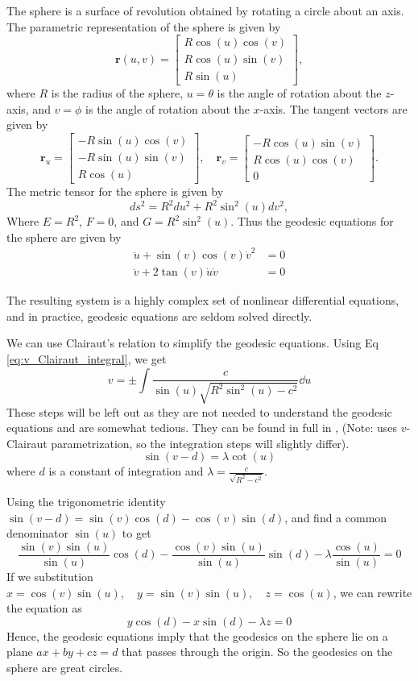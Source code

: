 \documentclass[12pt]{article}
\begin{document}
The sphere is a surface of revolution obtained by rotating a circle about an axis.
The parametric representation of the sphere is given by
\[
    \mathbf{r}(u, v) = \begin{bmatrix} R \cos (u) \cos (v) \\ R \cos (u) \sin (v) \\ R \sin (u) \end{bmatrix},
\]
where \(R\) is the radius of the sphere, \(u = \theta\) is the angle of rotation about the \(z\)-axis, and \(v = \phi\) is the angle of rotation about the \(x\)-axis.
The tangent vectors are given by
\[
    \mathbf{r}_u = \begin{bmatrix} -R \sin (u) \cos (v) \\ -R \sin (u) \sin (v) \\ R \cos (u) \end{bmatrix}, \quad \mathbf{r}_v = \begin{bmatrix} -R \cos (u) \sin (v) \\ R \cos (u) \cos (v) \\ 0 \end{bmatrix}.
\]
The metric tensor for the sphere is given by
\[
    ds^2 = R^2 du^2 + R^2 \sin^2 (u) dv^2,
\]
Where \(E = R^2 \), \(F = 0\), and \(G = R^2 \sin^2 (u)\).
Thus the geodesic equations for the sphere are given by
\begin{align*}
    \ddot{u} + \sin(v) \cos(v) \dot{v}^2 &= 0 \\
    \ddot{v} + 2\tan(v) \dot{u} \dot{v} &= 0 
\end{align*}

The resulting system is a highly complex set of nonlinear differential equations, and in practice, geodesic equations are seldom solved directly.

We can use Clairaut's relation to simplify the geodesic equations.
Using Eq \eqref{eq:v_Clairaut_integral}, we get 
\[
    v = \pm \int \frac{c}{\sin(u)\sqrt{R^2\sin^{2}(u) - c^{2}}} \dd{u}
\]
These steps will be left out as they are not needed to understand the geodesic equations and are somewhat tedious. 
They can be found in full in \cite{oprea2007differential}, (Note: \cite{oprea2007differential} uses $v$-Clairaut parametrization, so the integration steps will slightly differ).
\[
\sin(v - d) = \lambda \cot(u)
\]
where \(d\) is a constant of integration and \(\lambda = \frac{c}{\sqrt{R^2 - c^2}}\).

Using the trigonometric identity \(\sin(v - d) = \sin(v)\cos(d) - \cos(v)\sin(d)\),  and find a common denominator $\sin(u)$ to get
\[
    \frac{\sin(v)\sin(u)}{\sin(u)}\cos(d) - \frac{\cos(v)\sin(u)}{\sin(u)}\sin(d) - \lambda \frac{\cos(u)}{\sin(u)} = 0
\]
If we substitution \(x = \cos(v)\sin(u), \quad y = \sin(v)\sin(u), \quad z = \cos(u)\), we can rewrite the equation as
\[
    y\cos(d) - x\sin(d) - \lambda z = 0
\]
Hence, the geodesic equations imply that the geodesics on the sphere lie on a plane \( ax + by + cz = d \) that passes through the origin.
So the geodesics on the sphere are great circles.
\end{document}
